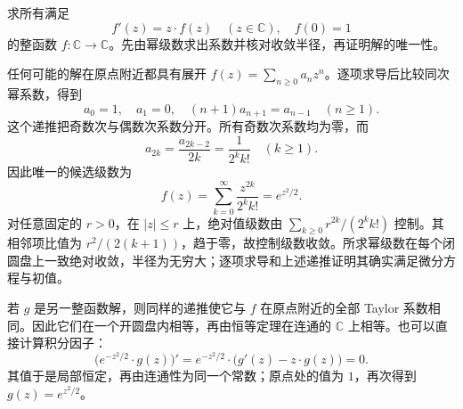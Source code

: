 \begin{exercise}\label{b3:ex:01-power-series-ode}
求所有满足
\[
  f'(z)=z\cdot f(z)\quad(z\in\mathbb C),
  \quad f(0)=1
\]
的整函数 \(f:\mathbb C\rightarrow\mathbb C\)。先由幂级数求出系数并核对收敛半径，再证明解的唯一性。
\end{exercise}
\begin{solution}
任何可能的解在原点附近都具有展开 \(f(z)=\sum_{n\ge0}a_nz^n\)。逐项求导后比较同次幂系数，得到
\[
  a_0=1,\quad a_1=0,
  \quad (n+1)a_{n+1}=a_{n-1}\quad(n\ge1).
\]
这个递推把奇数次与偶数次系数分开。所有奇数次系数均为零，而
\[
  a_{2k}=\frac{a_{2k-2}}{2k}
         =\frac1{2^k k!}\quad(k\ge1).
\]
因此唯一的候选级数为
\[
  f(z)=\sum_{k=0}^{\infty}\frac{z^{2k}}{2^k k!}
       =e^{z^2/2}.
\]
对任意固定的 \(r>0\)，在 \(|z|\le r\) 上，绝对值级数由
\(\sum_{k\ge0}r^{2k}/(2^k k!)\) 控制。其相邻项比值为
\(r^2/(2(k+1))\)，趋于零，故控制级数收敛。所求幂级数在每个闭圆盘上一致绝对收敛，半径为无穷大；逐项求导和上述递推证明其确实满足微分方程与初值。

若 \(g\) 是另一整函数解，则同样的递推使它与 \(f\) 在原点附近的全部 Taylor 系数相同。因此它们在一个开圆盘内相等，再由恒等定理在连通的 \(\mathbb C\) 上相等。也可以直接计算积分因子：
\[
  \bigl(e^{-z^2/2}\cdot g(z)\bigr)'
  =e^{-z^2/2}\cdot\bigl(g'(z)-z\cdot g(z)\bigr)=0.
\]
其值于是局部恒定，再由连通性为同一个常数；原点处的值为 \(1\)，再次得到 \(g(z)=e^{z^2/2}\)。
\end{solution}

